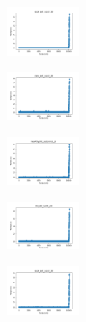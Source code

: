 \begin{figure}[H]
\begin{subfigure}
    \end{subfigure}
    \hfill
    \begin{subfigure}
        \centering
        \includegraphics[width=0.234\textwidth]{img/HS-LS/ecoli_set_const_20_589741062_time.png}
    \end{subfigure}
    \hfill
    \begin{subfigure}
        \centering
        \includegraphics[width=0.234\textwidth]{img/HS-LS/rand_set_const_20_589741062_time.png}
    \end{subfigure}
    \hfill
    \begin{subfigure}
        \centering
        \includegraphics[width=0.234\textwidth]{img/HS-LS/newthyroid_set_const_20_589741062_time.png}
    \end{subfigure}
    \hfill
    \begin{subfigure}
        \centering
        \includegraphics[width=0.234\textwidth]{img/HS-LS/iris_set_const_20_277451237_time.png}
    \end{subfigure}
    \hfill
    \begin{subfigure}
        \centering
        \includegraphics[width=0.234\textwidth]{img/HS-LS/ecoli_set_const_20_277451237_time.png}
    \end{subfigure}
    \hfill

\end{figure}
